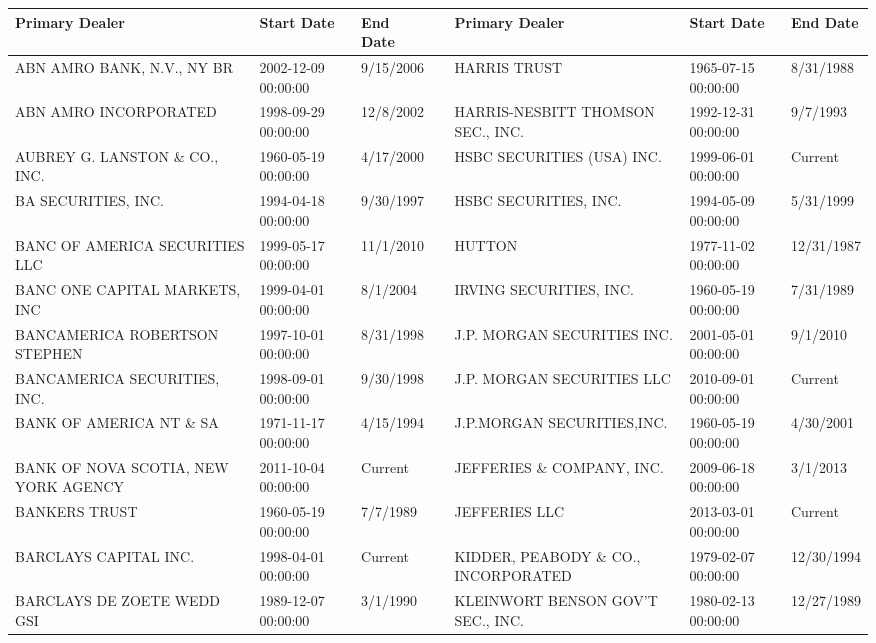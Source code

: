\begin{tabular}{lllllll}
\toprule
Primary Dealer & Start Date & End Date &  & Primary Dealer & Start Date & End Date \\
\midrule
ABN AMRO BANK, N.V., NY BR           & 2002-12-09 00:00:00 & 9/15/2006 &  & HARRIS TRUST                        & 1965-07-15 00:00:00 & 8/31/1988 \\
ABN AMRO INCORPORATED                & 1998-09-29 00:00:00 & 12/8/2002 &  & HARRIS-NESBITT THOMSON SEC., INC.   & 1992-12-31 00:00:00 & 9/7/1993 \\
AUBREY G. LANSTON \& CO., INC.       & 1960-05-19 00:00:00 & 4/17/2000 &  & HSBC SECURITIES (USA) INC.           & 1999-06-01 00:00:00 & Current \\
BA SECURITIES, INC.                 & 1994-04-18 00:00:00 & 9/30/1997 &  & HSBC SECURITIES, INC.                & 1994-05-09 00:00:00 & 5/31/1999 \\
BANC OF AMERICA SECURITIES LLC            & 1999-05-17 00:00:00 & 11/1/2010 &  & HUTTON                               & 1977-11-02 00:00:00 & 12/31/1987 \\
BANC ONE CAPITAL MARKETS, INC       & 1999-04-01 00:00:00 & 8/1/2004 &  & IRVING SECURITIES, INC.              & 1960-05-19 00:00:00 & 7/31/1989 \\
BANCAMERICA ROBERTSON STEPHEN       & 1997-10-01 00:00:00 & 8/31/1998 &  & J.P. MORGAN SECURITIES INC.         & 2001-05-01 00:00:00 & 9/1/2010 \\
BANCAMERICA SECURITIES, INC.        & 1998-09-01 00:00:00 & 9/30/1998 &  & J.P. MORGAN SECURITIES LLC & 2010-09-01 00:00:00 & Current \\
BANK OF AMERICA NT \& SA             & 1971-11-17 00:00:00 & 4/15/1994 &  & J.P.MORGAN SECURITIES,INC.           & 1960-05-19 00:00:00 & 4/30/2001 \\
BANK OF NOVA SCOTIA, NEW YORK AGENCY & 2011-10-04 00:00:00 & Current &  & JEFFERIES \& COMPANY, INC. & 2009-06-18 00:00:00 & 3/1/2013 \\
BANKERS TRUST                        & 1960-05-19 00:00:00 & 7/7/1989 &  & JEFFERIES LLC & 2013-03-01 00:00:00 & Current \\
BARCLAYS CAPITAL INC.                & 1998-04-01 00:00:00 & Current &  & KIDDER, PEABODY \& CO., INCORPORATED & 1979-02-07 00:00:00 & 12/30/1994 \\
BARCLAYS DE ZOETE WEDD GSI           & 1989-12-07 00:00:00 & 3/1/1990 &  & KLEINWORT BENSON  GOV'T SEC., INC.   & 1980-02-13 00:00:00 & 12/27/1989 \\

\end{tabular}
